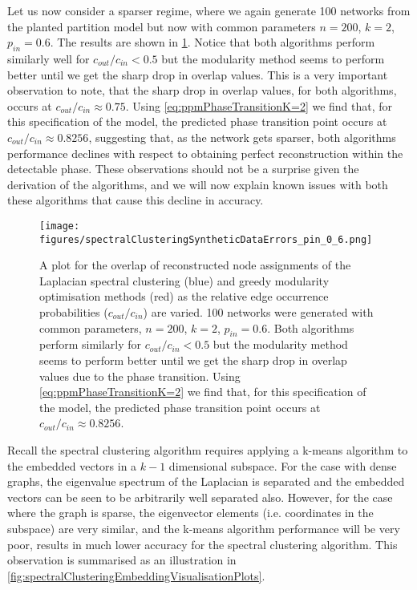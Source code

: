 Let us now consider a sparser regime, where we again generate 100 networks from the planted partition model but now with common parameters $n=200$, $k=2$, $p_{in}=0.6$.
The results are shown in \cref{fig:syntheticDataResultsPin0.6}.
Notice that both algorithms perform similarly well for $c_{out}/c_{in} < 0.5$ but the modularity method seems to perform better until we get the sharp drop in overlap values.
This is a very important observation to note, that the sharp drop in overlap values, for both algorithms, occurs at $c_{out}/c_{in} \approx 0.75$.
Using \cref{eq:ppmPhaseTransitionK=2} we find that, for this specification of the model, the predicted phase transition point occurs at $c_{out}/c_{in} \approx 0.8256$, suggesting that, as the network gets sparser, both algorithms performance declines with respect to obtaining perfect reconstruction within the detectable phase.
These observations should not be a surprise given the derivation of the algorithms, and we will now explain known issues with both these algorithms that cause this decline in accuracy.

\begin{figure}
	\centering
	\texttt{[image: figures/spectralClusteringSyntheticDataErrors\_pin\_0\_6.png]}
	\caption[Plot of overlap for spectral clustering and modularity methods in the sparse regime.]{\label{fig:syntheticDataResultsPin0.6} A plot for the overlap of reconstructed node assignments of the Laplacian spectral clustering (blue) and greedy modularity optimisation methods (red) as the relative edge occurrence probabilities ($c_{out}/c_{in}$) are varied. 100 networks were generated with common parameters, $n=200$, $k=2$, $p_{in}=0.6$. Both algorithms perform similarly for $c_{out}/c_{in} < 0.5$ but the modularity method seems to perform better until we get the sharp drop in overlap values due to the phase transition. Using \cref{eq:ppmPhaseTransitionK=2} we find that, for this specification of the model, the predicted phase transition point occurs at $c_{out}/c_{in} \approx 0.8256$.}
\end{figure}

Recall the spectral clustering algorithm requires applying a k-means algorithm to the embedded vectors in a $k-1$ dimensional subspace.
For the case with dense graphs, the eigenvalue spectrum of the Laplacian is separated and the embedded vectors can be seen to be arbitrarily well separated also.
However, for the case where the graph is sparse, the eigenvector elements (i.e. coordinates in the subspace) are very similar, and the k-means algorithm performance will be very poor, results in much lower accuracy for the spectral clustering algorithm.
This observation is summarised as an illustration in \cref{fig:spectralClusteringEmbeddingVisualisationPlots}.

